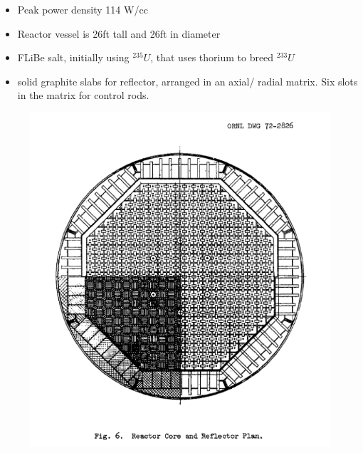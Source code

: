 \documentclass[letterpaper]{article}
\begin{document}
\begin{itemize}
\item Peak power density 114 W/cc
\item Reactor vessel is 26ft tall and 26ft in diameter
\item FLiBe salt, initially using ${}^{235}U$, that uses thorium to breed ${}^{233}U$
\item solid graphite slabs for reflector, arranged in an axial/ radial matrix.  Six slots in the matrix for control rods.
\end{itemize}

\begin{figure}[H]
  \centering
  \includegraphics[width=1.0\linewidth]{figures/MSDRsource1.png}
  \label{fig:fig5}
\end{figure}
\end{document}
